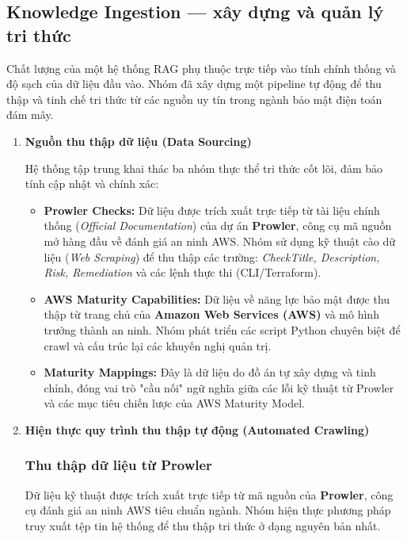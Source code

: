 \subsection{Knowledge Ingestion --- xây dựng và quản lý tri thức}

Chất lượng của một hệ thống RAG phụ thuộc trực tiếp vào tính chính thống và độ sạch của dữ liệu đầu vào. Nhóm đã xây dựng một pipeline tự động để thu thập và tinh chế tri thức từ các nguồn uy tín trong ngành bảo mật điện toán đám mây.

\begin{enumerate}
    \item \textbf{Nguồn thu thập dữ liệu (Data Sourcing)}

    Hệ thống tập trung khai thác ba nhóm thực thể tri thức cốt lõi, đảm bảo tính cập nhật và chính xác:
    \begin{itemize}
        \item \textbf{Prowler Checks:} Dữ liệu được trích xuất trực tiếp từ tài liệu chính thống (\textit{Official Documentation}) của dự án \textbf{Prowler}, công cụ mã nguồn mở hàng đầu về đánh giá an ninh AWS. Nhóm sử dụng kỹ thuật cào dữ liệu (\textit{Web Scraping}) để thu thập các trường: \textit{CheckTitle, Description, Risk, Remediation} và các lệnh thực thi (CLI/Terraform).

        \item \textbf{AWS Maturity Capabilities:} Dữ liệu về năng lực bảo mật được thu thập từ trang chủ của \textbf{Amazon Web Services (AWS)} và mô hình trưởng thành an ninh. Nhóm phát triển các script Python chuyên biệt để crawl và cấu trúc lại các khuyến nghị quản trị.

        \item \textbf{Maturity Mappings:} Đây là dữ liệu do đồ án tự xây dựng và tinh chỉnh, đóng vai trò "cầu nối" ngữ nghĩa giữa các lỗi kỹ thuật từ Prowler và các mục tiêu chiến lược của AWS Maturity Model.
    \end{itemize}

    \item \textbf{Hiện thực quy trình thu thập tự động (Automated Crawling)}
    \subsubsection*{Thu thập dữ liệu từ Prowler}
    Dữ liệu kỹ thuật được trích xuất trực tiếp từ mã nguồn của \textbf{Prowler}, công cụ đánh giá an ninh AWS tiêu chuẩn ngành. Nhóm hiện thực phương pháp truy xuất tệp tin hệ thống để thu thập tri thức ở dạng nguyên bản nhất.


\end{enumerate}

